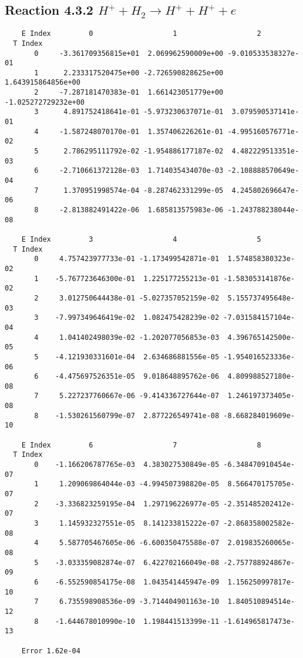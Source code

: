 \documentclass[12pt]{article}
\begin{document}
                               


\newpage
\subsection{
Reaction 4.3.2 $   H^+ + H_2 \rightarrow H^+ + H^+ + e$}


\begin{small}\begin{verbatim}
    E Index         0                   1                   2
  T Index
       0     -3.361709356815e+01  2.069962590009e+00 -9.010533538327e-01
       1      2.233317520475e+00 -2.726590828625e+00  1.643915864856e+00
       2     -7.287181470383e-01  1.661423051779e+00 -1.025272729232e+00
       3      4.891752418641e-01 -5.973230637071e-01  3.079590537141e-01
       4     -1.587248070170e-01  1.357406226261e-01 -4.995160576771e-02
       5      2.786295111792e-02 -1.954886177187e-02  4.482229513351e-03
       6     -2.710661372128e-03  1.714035434070e-03 -2.108888570649e-04
       7      1.370951998574e-04 -8.287462331299e-05  4.245802696647e-06
       8     -2.813882491422e-06  1.685813575983e-06 -1.243788238044e-08

    E Index         3                   4                   5
  T Index
       0     4.757423977733e-01 -1.173499542871e-01  1.574858380323e-02
       1    -5.767723646300e-01  1.225177255213e-01 -1.583053141876e-02
       2     3.012750644438e-01 -5.027357052159e-02  5.155737495648e-03
       3    -7.997349646419e-02  1.082475428239e-02 -7.031584157104e-04
       4     1.041402498039e-02 -1.202077056853e-03  4.396765142500e-05
       5    -4.121930331601e-04  2.634686881556e-05 -1.954016523336e-06
       6    -4.475697526351e-05  9.018648895762e-06  4.809988527180e-08
       7     5.227237760667e-06 -9.414336727644e-07  1.246197373405e-08
       8    -1.530261560799e-07  2.877226549741e-08 -8.668284019609e-10

    E Index         6                   7                   8
  T Index
       0    -1.166206787765e-03  4.383027530849e-05 -6.348470910454e-07
       1     1.209069864044e-03 -4.994507398820e-05  8.566470175705e-07
       2    -3.336823259195e-04  1.297196226977e-05 -2.351485202412e-07
       3     1.145932327551e-05  8.141233815222e-07 -2.868358002582e-08
       4     5.587705467605e-06 -6.600350475588e-07  2.019835260065e-08
       5    -3.033359082874e-07  6.422702166049e-08 -2.757788924867e-09
       6    -6.552590854175e-08  1.043541445947e-09  1.156250997817e-10
       7     6.735598908536e-09 -3.714404901163e-10  1.840510894514e-12
       8    -1.644678010990e-10  1.198441513399e-11 -1.614965817473e-13

    Error 1.62e-04
\end{verbatim}\end{small}
\end{document}

